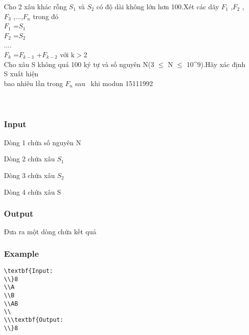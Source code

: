 



   Cho 2 xâu khác rỗng $S_{1}$   và $S_{2}$   có độ dài không lớn hơn 100.Xét các dãy $F_{1}$   ,$F_{2}$   ,$F_{3}$   ,...,$F_{n}$   trong đó   
\\   $F_{1}$   =$S_{1}$
\\   $F_{2}$   =$S_{2}$
\\   ....   
\\   $F_{k}$   =$F_{k-1}$   +$F_{k-2}$   với k$>$2   
\\   Cho xâu S không quá 100 ký tự và số nguyên N(3 $\le$ N $\le$ 10^9).Hãy xác định S xuất hiện   
\\   bao nhiêu lần trong $F_{n}$   sau  khi modun 15111992   
\\
\\
\\

\subsubsection{   Input  }

   Dòng 1 chứa số nguyên N  

   Dòng 2 chứa xâu $S_{1}$

   Dòng 3 chứa xâu $S_{2}$

   Dòng 4 chứa xâu S  

\subsubsection{   Output  }

   Đưa ra một dòng chứa kết quả  

\subsubsection{   Example  }
\begin{verbatim}
\textbf{Input:
\\}8
\\A
\\B
\\AB
\\
\\\textbf{Output:
\\}8 \end{verbatim}

